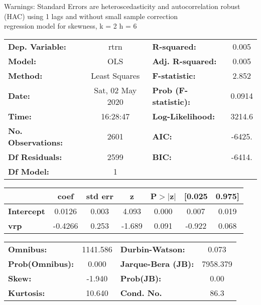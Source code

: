Warnings: \newline
 [1] Standard Errors are heteroscedasticity and autocorrelation robust (HAC) using 1 lags and without small sample correction\\ 

regression model for skewness, k = 2 h = 6\begin{center}
\begin{tabular}{lclc}
\toprule
\textbf{Dep. Variable:}    &       rtrn       & \textbf{  R-squared:         } &     0.005   \\
\textbf{Model:}            &       OLS        & \textbf{  Adj. R-squared:    } &     0.005   \\
\textbf{Method:}           &  Least Squares   & \textbf{  F-statistic:       } &     2.852   \\
\textbf{Date:}             & Sat, 02 May 2020 & \textbf{  Prob (F-statistic):} &   0.0914    \\
\textbf{Time:}             &     16:28:47     & \textbf{  Log-Likelihood:    } &    3214.6   \\
\textbf{No. Observations:} &        2601      & \textbf{  AIC:               } &    -6425.   \\
\textbf{Df Residuals:}     &        2599      & \textbf{  BIC:               } &    -6414.   \\
\textbf{Df Model:}         &           1      & \textbf{                     } &             \\
\bottomrule
\end{tabular}
\begin{tabular}{lcccccc}
                   & \textbf{coef} & \textbf{std err} & \textbf{z} & \textbf{P$> |$z$|$} & \textbf{[0.025} & \textbf{0.975]}  \\
\midrule
\textbf{Intercept} &       0.0126  &        0.003     &     4.093  &         0.000        &        0.007    &        0.019     \\
\textbf{vrp}       &      -0.4266  &        0.253     &    -1.689  &         0.091        &       -0.922    &        0.068     \\
\bottomrule
\end{tabular}
\begin{tabular}{lclc}
\textbf{Omnibus:}       & 1141.586 & \textbf{  Durbin-Watson:     } &    0.073  \\
\textbf{Prob(Omnibus):} &   0.000  & \textbf{  Jarque-Bera (JB):  } & 7958.379  \\
\textbf{Skew:}          &  -1.940  & \textbf{  Prob(JB):          } &     0.00  \\
\textbf{Kurtosis:}      &  10.640  & \textbf{  Cond. No.          } &     86.3  \\
\bottomrule
\end{tabular}
\end{center}

